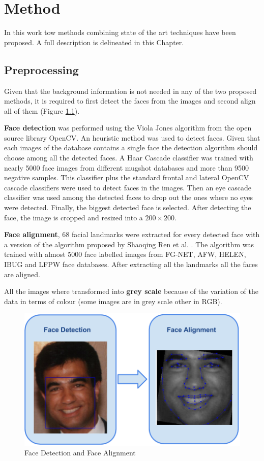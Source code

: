 \chapter{Method} \label{chap:method}
In this work tow methods combining state of the art techniques have been proposed. A full description is delineated in this Chapter.

\section{Preprocessing}

Given that the background information is not needed in any of the two proposed methods, it is required to first detect the faces from the images and second align all of them (Figure \ref{fig:preprocessing}).

\textbf{Face detection} was performed using the Viola Jones algorithm from the open source library OpenCV. An heuristic method was used to detect faces. Given that each images of the database contains a single face the detection algorithm should choose among all the detected faces. A Haar Cascade classifier was trained with nearly 5000 face images from different mugshot databases and more than 9500 negative samples. This classifier plus the standard frontal and lateral OpenCV cascade classifiers were used to detect faces in the images. Then an eye cascade classifier was used among the detected faces to drop out the ones where no eyes were detected. Finally, the biggest detected face is selected. After detecting the face, the image is cropped and resized into a $200 \times 200$.

\textbf{Face alignment}, 68 facial landmarks were extracted for every detected face with a version of the algorithm proposed by Shaoqing Ren et al. \cite{ren2014face}. The algorithm was trained with almost 5000 face labelled images from FG-NET, AFW, HELEN, IBUG and LFPW face databases. After extracting all the landmarks all the faces are aligned.

All the images where transformed into \textbf{grey scale} because of the variation of the data in terms of colour (some images are in grey scale other in RGB).

\begin{figure}[!h]
	\centering
	\includegraphics[width=\textwidth]{figures/preprocessing}
	\caption{Face Detection and Face Alignment}
	\label{fig:preprocessing}
\end{figure}


